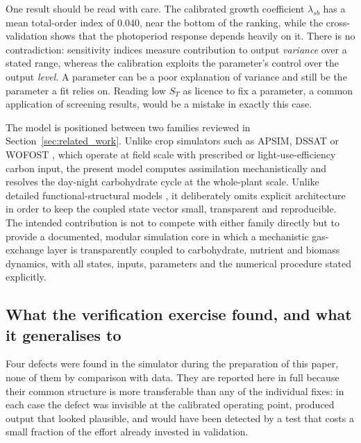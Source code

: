 \documentclass[a4paper,fleqn]{cas-sc}
\begin{document}
One result should be read with care. The calibrated growth coefficient
$\lambda_{sb}$ has a mean total-order index of $0.040$, near the bottom of
the ranking, while the cross-validation shows that the photoperiod response
depends heavily on it. There is no contradiction: sensitivity indices measure
contribution to output \emph{variance} over a stated range, whereas the
calibration exploits the parameter's control over the output \emph{level}. A
parameter can be a poor explanation of variance and still be the parameter a
fit relies on. Reading low $S_T$ as licence to fix a parameter, a common
application of screening results, would be a mistake in exactly this case.

The model is positioned between two families reviewed in Section~\ref{sec:related_work}. Unlike crop simulators such as APSIM, DSSAT or WOFOST \cite{Holzworth2014,Jones2003,deWit2019}, which operate at field scale with prescribed or light-use-efficiency carbon input, the present model computes assimilation mechanistically and resolves the day-night carbohydrate cycle at the whole-plant scale. Unlike detailed functional-structural models \cite{DeReffye2020,Louarn2020}, it deliberately omits explicit architecture in order to keep the coupled state vector small, transparent and reproducible. The intended contribution is not to compete with either family directly but to provide a documented, modular simulation core in which a mechanistic gas-exchange layer is transparently coupled to carbohydrate, nutrient and biomass dynamics, with all states, inputs, parameters and the numerical procedure stated explicitly.

\subsection{What the verification exercise found, and what it generalises to}
\label{sec:verification_lessons}

Four defects were found in the simulator during the preparation of this
paper, none of them by comparison with data. They are reported here in full
because their common structure is more transferable than any of the
individual fixes: in each case the defect was invisible at the calibrated
operating point, produced output that looked plausible, and would have been
detected by a test that costs a small fraction of the effort already invested
in validation.
\end{document}
